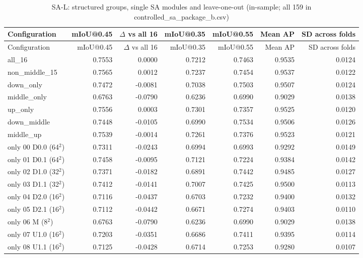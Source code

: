 {\scriptsize\setlength{\tabcolsep}{3pt}
\begin{longtable}{>{\raggedright\arraybackslash}p{3.73cm}rrrrrr}
\caption{SA-L: structured groups, single SA modules and leave-one-out (in-sample; all 159 in controlled\_\allowbreak{}sa\_\allowbreak{}package\_\allowbreak{}b.csv)}\label{tab:a4_sa_l}\\
\toprule
Configuration & mIoU@0.45 & $\Delta$ vs all 16 & mIoU@0.35 & mIoU@0.55 & Mean AP & SD across folds \\
\midrule
\endfirsthead
\toprule
Configuration & mIoU@0.45 & $\Delta$ vs all 16 & mIoU@0.35 & mIoU@0.55 & Mean AP & SD across folds \\
\midrule
\endhead
all\_\allowbreak{}16 & 0.7553 & 0.0000 & 0.7212 & 0.7463 & 0.9535 & 0.0124 \\
non\_\allowbreak{}middle\_\allowbreak{}15 & 0.7565 & 0.0012 & 0.7237 & 0.7454 & 0.9537 & 0.0122 \\
down\_\allowbreak{}only & 0.7472 & -0.0081 & 0.7038 & 0.7503 & 0.9507 & 0.0124 \\
middle\_\allowbreak{}only & 0.6763 & -0.0790 & 0.6236 & 0.6990 & 0.9029 & 0.0138 \\
up\_\allowbreak{}only & 0.7556 & 0.0003 & 0.7301 & 0.7357 & 0.9525 & 0.0120 \\
down\_\allowbreak{}middle & 0.7448 & -0.0105 & 0.6990 & 0.7534 & 0.9506 & 0.0126 \\
middle\_\allowbreak{}up & 0.7539 & -0.0014 & 0.7261 & 0.7376 & 0.9523 & 0.0121 \\
only 00 D0.0 (64$^2$) & 0.7311 & -0.0243 & 0.6994 & 0.6993 & 0.9292 & 0.0149 \\
only 01 D0.1 (64$^2$) & 0.7458 & -0.0095 & 0.7121 & 0.7224 & 0.9384 & 0.0142 \\
only 02 D1.0 (32$^2$) & 0.7371 & -0.0182 & 0.6891 & 0.7442 & 0.9485 & 0.0127 \\
only 03 D1.1 (32$^2$) & 0.7412 & -0.0141 & 0.7007 & 0.7425 & 0.9500 & 0.0113 \\
only 04 D2.0 (16$^2$) & 0.7116 & -0.0437 & 0.6703 & 0.7232 & 0.9400 & 0.0132 \\
only 05 D2.1 (16$^2$) & 0.7112 & -0.0442 & 0.6671 & 0.7274 & 0.9403 & 0.0110 \\
only 06 M (8$^2$) & 0.6763 & -0.0790 & 0.6236 & 0.6990 & 0.9029 & 0.0138 \\
only 07 U1.0 (16$^2$) & 0.7203 & -0.0351 & 0.6686 & 0.7411 & 0.9395 & 0.0114 \\
only 08 U1.1 (16$^2$) & 0.7125 & -0.0428 & 0.6714 & 0.7253 & 0.9280 & 0.0107 \\

\end{longtable}}
